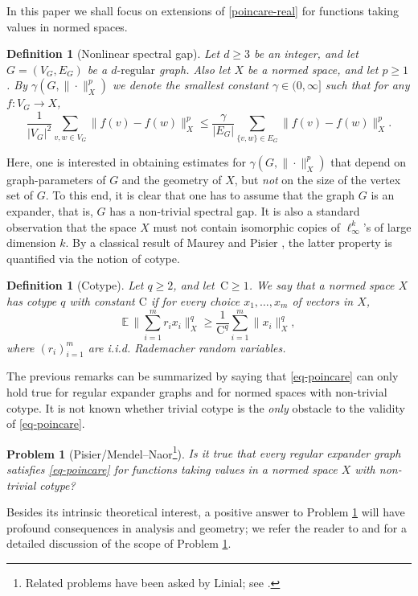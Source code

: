 \documentclass[11pt,leqno]{amsart}
\newtheorem{definition}[theorem]{Definition}
\newtheorem{problem}[theorem]{Problem}
\theoremstyle{remark}
\theoremstyle{plain}
\newcommand{\Exp}{\mathbb{E}}
\begin{document}
In this paper we shall focus on extensions of \eqref{poincare-real} for functions taking values in normed spaces.
\begin{definition}[Nonlinear spectral gap]
Let $d\geqslant 3$ be an integer, and let $G=(V_G,E_G)$ be a $d\text{-regular}$ graph. Also let $X$ be a normed space,
and let $p\geqslant 1$. By $\gamma(G,\|\cdot\|_X^p)$ we denote the smallest constant $\gamma\in (0,\infty]$ such that
for any $f\colon V_G \to X$,
\begin{equation} \label{eq-poincare}
\frac{1}{|V_G|^2} \sum_{v,w\in V_G} \|f(v)-f(w)\|_X^p \leqslant \frac{\gamma}{|E_G|}
\sum_{\{v,w\}\in E_G} \|f(v)-f(w)\|_X^p.
\end{equation}
\end{definition}
Here, one is interested in obtaining estimates for $\gamma(G,\|\cdot\|_X^p)$ that depend on graph-parameters of $G$ and the
geometry of $X$, but \emph{not} on the size of the vertex set of $G$. To this end, it is clear that one has to assume
that the graph $G$ is an expander, that is, $G$ has a non-trivial spectral gap. It is also a standard observation that
the space $X$ must not contain isomorphic copies of $\ell_{\infty}^k$'s of large dimension $k$.
By a classical result of Maurey and Pisier \cite{MP76}, the latter property is quantified via the notion of cotype.
\begin{definition}[Cotype]
Let $q\geqslant 2$, and let\, $\mathrm{C}\geqslant 1$. We say that a normed space $X$ has
\emph{cotype $q$ with constant $\mathrm{C}$}
if for every choice $x_1,\dots,x_m$ of vectors in $X$,
\[ \Exp\,\Big\|\sum_{i=1}^m r_i x_i\Big\|_X^q \geqslant \frac{1}{\mathrm{C}^q}\sum_{i=1}^m \|x_i\|_X^q, \]
where $(r_i)_{i=1}^m$ are i.i.d. Rademacher random variables.
\end{definition}
The previous remarks can be summarized by saying that \eqref{eq-poincare}
can only hold true for regular expander graphs and for normed spaces with non-trivial cotype.
It is not known whether trivial cotype is the \emph{only} obstacle to the validity of \eqref{eq-poincare}.
\begin{problem}[Pisier/Mendel--Naor\footnote{Related problems have been asked by Linial;
see \cite[Paragraph 3.1]{Ma11}.}] \label{prob-pmn}
Is it true that every regular expander graph satisfies \eqref{eq-poincare}
for functions taking values in a normed space $X$ with non-trivial cotype?
\end{problem}
Besides its intrinsic theoretical interest, a positive answer to Problem \ref{prob-pmn}
will have profound consequences in analysis and geometry; we refer the reader to \cite[Section 1]{MN14}
and \cite[Section~6]{Es22} for a detailed discussion of the scope of Problem \ref{prob-pmn}.
\end{document}
